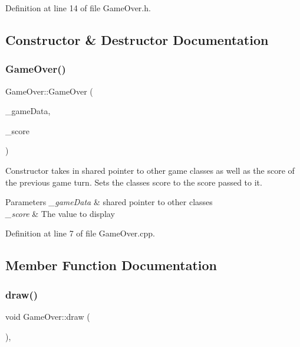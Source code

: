 Definition at line 14 of file Game\+Over.\+h.



\subsection{Constructor \& Destructor Documentation}
\mbox{\label{class_game_over_ae8969c43377583bf4d81c048718f8d94}} 
\subsubsection{\texorpdfstring{GameOver()}{GameOver()}}
{\footnotesize\ttfamily Game\+Over\+::\+Game\+Over (\begin{DoxyParamCaption}\item[{\mbox{\hyperlink{_engine_8h_a5bbe002e9f7f45a67e8fda9dbe980a3f}{Game\+Data}}}]{\+\_\+game\+Data,  }\item[{int}]{\+\_\+score }\end{DoxyParamCaption})}

Constructor takes in shared pointer to other game classes as well as the score of the previous game turn. Sets the classes score to the score passed to it. 
\begin{DoxyParams}{Parameters}
{\em \+\_\+game\+Data} & shared pointer to other classes \\
\hline
{\em \+\_\+score} & The value to display \\
\hline
\end{DoxyParams}


Definition at line 7 of file Game\+Over.\+cpp.



\subsection{Member Function Documentation}
\mbox{\label{class_game_over_a29ee6ef26eca92bac58c9917e933bce4}} 
\subsubsection{\texorpdfstring{draw()}{draw()}}
{\footnotesize\ttfamily void Game\+Over\+::draw (\begin{DoxyParamCaption}{ }\end{DoxyParamCaption})\hspace{0.3cm}{\ttfamily [override]}, {\ttfamily [virtual]}}

